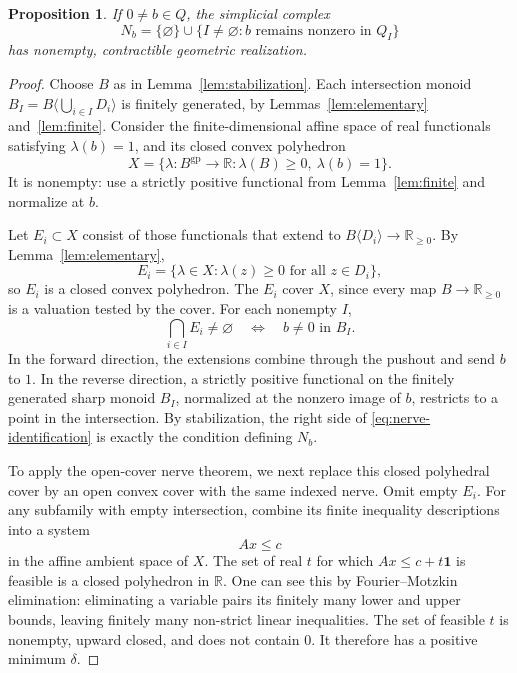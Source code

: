 \documentclass[11pt]{article}
\newtheorem{proposition}[theorem]{Proposition}
\theoremstyle{definition}
\theoremstyle{remark}
\newcommand{\R}{\mathbb R}
\newcommand{\gp}{\mathrm{gp}}
\begin{document}
\begin{proposition}\label{prop:nerve}
If $0\neq b\in Q$, the simplicial complex
\[
 N_b=\{\varnothing\}\cup
 \{I\neq\varnothing:b\text{ remains nonzero in }Q_I\}
\]
has nonempty, contractible geometric realization.
\end{proposition}

\begin{proof}
Choose $B$ as in Lemma~\ref{lem:stabilization}. Each intersection monoid
$B_I=B\langle\bigcup_{i\in I}D_i\rangle$ is finitely generated, by Lemmas~\ref{lem:elementary} and~\ref{lem:finite}. Consider the finite-dimensional affine space of real functionals satisfying $\lambda(b)=1$, and its closed convex polyhedron
\[
 X=\{\lambda:B^{\gp}\to\R:\lambda(B)\geq0,\ \lambda(b)=1\}.
\]
It is nonempty: use a strictly positive functional from Lemma~\ref{lem:finite} and normalize at $b$.

Let $E_i\subset X$ consist of those functionals that extend to $B\langle D_i\rangle\to\R_{\geq0}$. By Lemma~\ref{lem:elementary},
\[
 E_i=\{\lambda\in X:\lambda(z)\geq0\text{ for all }z\in D_i\},
\]
so $E_i$ is a closed convex polyhedron. The $E_i$ cover $X$, since every map $B\to\R_{\geq0}$ is a valuation tested by the cover. For each nonempty $I$,
\begin{equation}\label{eq:nerve-identification}
 \bigcap_{i\in I}E_i\neq\varnothing
 \quad\Longleftrightarrow\quad b\neq0\text{ in }B_I.
\end{equation}
In the forward direction, the extensions combine through the pushout and send $b$ to $1$. In the reverse direction, a strictly positive functional on the finitely generated sharp monoid $B_I$, normalized at the nonzero image of $b$, restricts to a point in the intersection. By stabilization, the right side of \eqref{eq:nerve-identification} is exactly the condition defining $N_b$.

To apply the open-cover nerve theorem, we next replace this closed polyhedral cover by an open convex cover with the same indexed nerve. Omit empty $E_i$. For any subfamily with empty intersection, combine its finite inequality descriptions into a system
\[
 Ax\leq c
\]
in the affine ambient space of $X$. The set of real $t$ for which $Ax\leq c+t\mathbf1$ is feasible is a closed polyhedron in $\R$. One can see this by Fourier--Motzkin elimination: eliminating a variable pairs its finitely many lower and upper bounds, leaving finitely many non-strict linear inequalities. The set of feasible $t$ is nonempty, upward closed, and does not contain $0$. It therefore has a positive minimum $\delta$.


\end{proof}
\end{document}
